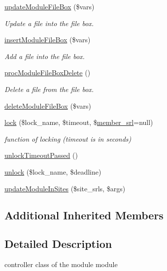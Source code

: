 \begin{DoxyCompactItemize}
\hyperlink{classmoduleController_af1ea81da50538369f648be26252ddd26}{update\-Module\-File\-Box} (\$vars)
\begin{DoxyCompactList}\small\item\em Update a file into the file box. \end{DoxyCompactList}\item 
\hyperlink{classmoduleController_a141cdf2d372314e8661c276cdb8bd889}{insert\-Module\-File\-Box} (\$vars)
\begin{DoxyCompactList}\small\item\em Add a file into the file box. \end{DoxyCompactList}\item 
\hyperlink{classmoduleController_a2b4e5ffa008e6a0a00bfe9844f475b0d}{proc\-Module\-File\-Box\-Delete} ()
\begin{DoxyCompactList}\small\item\em Delete a file from the file box. \end{DoxyCompactList}\item 
\hyperlink{classmoduleController_a26ff8a052af05f873237f3023e3e1bde}{delete\-Module\-File\-Box} (\$vars)
\item 
\hyperlink{classmoduleController_a1395c1be0ebed50078212640fba409be}{lock} (\$lock\-\_\-name, \$timeout, \$\hyperlink{ko_8install_8php_aa61f9e08f0fe505094d26f8143f30bbd}{member\-\_\-srl}=null)
\begin{DoxyCompactList}\small\item\em function of locking (timeout is in seconds) \end{DoxyCompactList}\item 
\hyperlink{classmoduleController_aac97ab294279631cb3cf1078063e8b56}{unlock\-Timeout\-Passed} ()
\item 
\hyperlink{classmoduleController_a79a5d8ecb0bc6186756e80144cbca92f}{unlock} (\$lock\-\_\-name, \$deadline)
\item 
\hyperlink{classmoduleController_a1d2d1c0845ee050c4f837dea9b9beab1}{update\-Module\-In\-Sites} (\$site\-\_\-srls, \$args)
\end{DoxyCompactItemize}
\subsection*{Additional Inherited Members}


\subsection{Detailed Description}
controller class of the module module 

